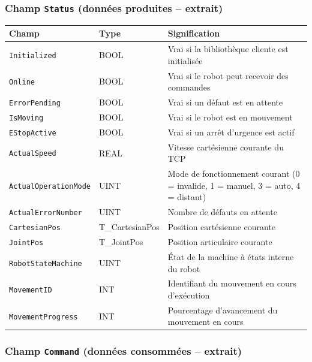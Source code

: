 \subsubsection{Champ \texttt{Status} (données produites -- extrait)}

\begin{center}
\begin{tabular}{|l|l|p{6.5cm}|}
\hline
\textbf{Champ} & \textbf{Type} & \textbf{Signification} \\
\hline
\texttt{Initialized} & BOOL & Vrai si la bibliothèque cliente est
initialisée \\
\hline
\texttt{Online} & BOOL & Vrai si le robot peut recevoir des commandes \\
\hline
\texttt{ErrorPending} & BOOL & Vrai si un défaut est en attente \\
\hline
\texttt{IsMoving} & BOOL & Vrai si le robot est en mouvement \\
\hline
\texttt{EStopActive} & BOOL & Vrai si un arrêt d'urgence est actif \\
\hline
\texttt{ActualSpeed} & REAL & Vitesse cartésienne courante du TCP \\
\hline
\texttt{ActualOperationMode} & UINT & Mode de fonctionnement courant
(0 = invalide, 1 = manuel, 3 = auto, 4 = distant) \\
\hline
\texttt{ActualErrorNumber} & UINT & Nombre de défauts en attente \\
\hline
\texttt{CartesianPos} & T\_CartesianPos & Position cartésienne courante \\
\hline
\texttt{JointPos} & T\_JointPos & Position articulaire courante \\
\hline
\texttt{RobotStateMachine} & UINT & État de la machine à états interne du
robot \\
\hline
\texttt{MovementID} & INT & Identifiant du mouvement en cours d'exécution \\
\hline
\texttt{MovementProgress} & INT & Pourcentage d'avancement du mouvement en
cours \\
\hline
\end{tabular}
\end{center}

\subsubsection{Champ \texttt{Command} (données consommées -- extrait)}

